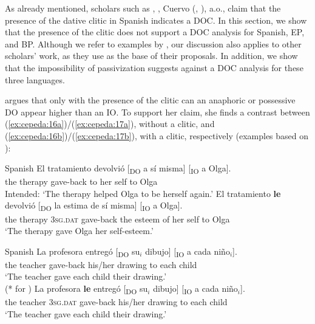 \documentclass[output=paper,colorlinks,citecolor=brown,nonflat]{./langscibook}
\begin{document}
As already mentioned, scholars such as \citet{Demonte1995}, \citet{Bleam2003}, Cuervo (\citeyear{Cuervo2003}, \citeyear{Cuervo2010Proceedings}), a.o., claim that the presence of the dative clitic in Spanish indicates a DOC. In this section, we show that the presence of the clitic does not support a DOC analysis for Spanish, EP, and BP. Although we refer to examples by \citet{Demonte1995}, our discussion also applies to other scholars’ work, as they use \citet{Demonte1995} as the base of their proposals. In addition, we show that the impossibility of passivization suggests against a DOC analysis for these three languages.

\citet{Demonte1995} argues that only with the presence of the clitic can an anaphoric or possessive DO appear higher than an IO. To support her claim, she finds a contrast between (\ref{ex:cepeda:16a})/(\ref{ex:cepeda:17a}), without a clitic, and (\ref{ex:cepeda:16b})/(\ref{ex:cepeda:17b}), with a clitic, respectively (examples based on \citeauthor{Demonte1995}):

\newpage 

\ea%
    \label{ex:cepeda:16} Spanish
	\ea\label{ex:cepeda:16a}
	\gll El tratamiento devolvió [\textsubscript{DO} a sí  misma] [\textsubscript{IO} a Olga].\\
		the therapy      gave-back \hspaceThis{[\textsubscript{DO}} to her self \hspaceThis{[\textsubscript{IO}} to Olga\\
	\glt Intended: ‘The therapy helped Olga to be herself again.’
	\ex\label{ex:cepeda:16b}
	\gll El tratamiento \textbf{le} devolvió [\textsubscript{DO} la estima  de sí  misma] [\textsubscript{IO} a Olga].\\
		the therapy \textsc{3sg.dat} gave-back \hspaceThis{[\textsubscript{DO}} the esteem of her self \hspaceThis{[\textsubscript{IO}} to Olga\\
	\glt ‘The therapy gave Olga her self-esteem.’
	\z
\z

\ea%
    \label{ex:cepeda:17} 
    Spanish
	\ea\label{ex:cepeda:17a}
	\gll La  profesora entregó [\textsubscript{DO} su$_i$ dibujo] [\textsubscript{IO} a  cada  niño$_i$].\\
		the teacher gave-back \hspaceThis{[\textsubscript{DO}} his/her drawing \hspaceThis{[\textsubscript{IO}} to each child\\
	\glt ‘The teacher gave each child their drawing.’\\
			(* for \citeauthor{Demonte1995})
	\ex\label{ex:cepeda:17b}
	\gll  La  profesora \textbf{le} entregó [\textsubscript{DO} su$_i$ dibujo] [\textsubscript{IO} a  cada  niño$_i$].\\
		the teacher \textsc{3sg.dat}  gave-back \hspaceThis{[\textsubscript{DO}} his/her drawing \hspaceThis{[\textsubscript{IO}} to each child\\
	\glt ‘The teacher gave each child their drawing.’
	\z
\z
\end{document}
